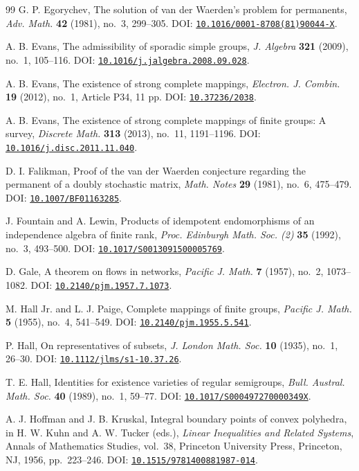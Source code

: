 \documentclass[11pt]{article}
\newcommand{\doilink}[1]{\href{https://doi.org/#1}{\nolinkurl{#1}}}
\theoremstyle{plain}
\theoremstyle{remark}
\theoremstyle{definition}
\theoremstyle{plain}
\begin{document}
\begin{thebibliography}{99}
G. P. Egorychev,
The solution of van der Waerden's problem for permanents,
\textit{Adv. Math.} \textbf{42} (1981), no.~3, 299--305.
DOI: \doilink{10.1016/0001-8708(81)90044-X}.

A. B. Evans,
The admissibility of sporadic simple groups,
\textit{J. Algebra} \textbf{321} (2009), no.~1, 105--116.
DOI: \doilink{10.1016/j.jalgebra.2008.09.028}.

A. B. Evans,
The existence of strong complete mappings,
\textit{Electron. J. Combin.} \textbf{19} (2012), no.~1, Article P34, 11 pp.
DOI: \doilink{10.37236/2038}.

A. B. Evans,
The existence of strong complete mappings of finite groups: A survey,
\textit{Discrete Math.} \textbf{313} (2013), no.~11, 1191--1196.
DOI: \doilink{10.1016/j.disc.2011.11.040}.

D. I. Falikman,
Proof of the van der Waerden conjecture regarding the permanent of a doubly stochastic matrix,
\textit{Math. Notes} \textbf{29} (1981), no.~6, 475--479.
DOI: \doilink{10.1007/BF01163285}.

J. Fountain and A. Lewin,
Products of idempotent endomorphisms of an independence algebra of finite rank,
\textit{Proc. Edinburgh Math. Soc. (2)} \textbf{35} (1992), no.~3, 493--500.
DOI: \doilink{10.1017/S0013091500005769}.

D. Gale,
A theorem on flows in networks,
\textit{Pacific J. Math.} \textbf{7} (1957), no.~2, 1073--1082.
DOI: \doilink{10.2140/pjm.1957.7.1073}.

M. Hall Jr. and L. J. Paige,
Complete mappings of finite groups,
\textit{Pacific J. Math.} \textbf{5} (1955), no.~4, 541--549.
DOI: \doilink{10.2140/pjm.1955.5.541}.

P. Hall,
On representatives of subsets,
\textit{J. London Math. Soc.} \textbf{10} (1935), no.~1, 26--30.
DOI: \doilink{10.1112/jlms/s1-10.37.26}.

T. E. Hall,
Identities for existence varieties of regular semigroups,
\textit{Bull. Austral. Math. Soc.} \textbf{40} (1989), no.~1, 59--77.
DOI: \doilink{10.1017/S000497270000349X}.

A. J. Hoffman and J. B. Kruskal,
Integral boundary points of convex polyhedra,
in H. W. Kuhn and A. W. Tucker (eds.),
\emph{Linear Inequalities and Related Systems},
Annals of Mathematics Studies, vol.~38,
Princeton University Press, Princeton, NJ, 1956, pp.~223--246.
DOI: \doilink{10.1515/9781400881987-014}.


\end{thebibliography}
\end{document}
